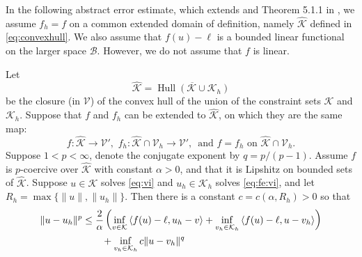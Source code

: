 \documentclass[hidelinks,onefignum,onetabnum,final]{siamart220329}  %
\newcommand{\cB}{\mathcal{B}}
\newcommand{\cK}{\mathcal{K}}
\newcommand{\cV}{\mathcal{V}}
\newcommand{\hcK}{\widehat{\cK}}
\newcommand{\ip}[2]{\left<#1,#2\right>}
\DeclareMathOperator*{\Hull}{Hull}
\begin{document}
In the following abstract error estimate, which extends \cite{Falk1974} and Theorem 5.1.1 in \cite{Ciarlet2002}, we assume $f_h=f$ on a common extended domain of definition, namely $\hcK$ defined in \eqref{eq:convexhull}.  We also assume that $f(u)-\ell$ is a bounded linear functional on the larger space $\cB$.  However, we do not assume that $f$ is linear.

\begin{theorem} \label{thm:abstractestimate}  Let
\begin{equation}
\hcK = \overline{\Hull{(\cK \cup \cK_h)}}  \label{eq:convexhull}
\end{equation}
be the closure (in $\cV$) of the convex hull of the union of the constraint sets $\cK$ and $\cK_h$.  Suppose that $f$ and $f_h$ can be extended to $\hcK$, on which they are the same map:
\begin{equation}
f:\hcK \to \cV', \,\, f_h:\hcK \cap \cV_h \to \cV', \, \text{ and } f=f_h \text{ on } \hcK \cap \cV_h.  \label{eq:commonextension}
\end{equation}
Suppose $1<p<\infty$, denote the conjugate exponent by $q=p/(p-1)$.  Assume $f$ is $p$-coercive over $\hcK$ with constant $\alpha>0$, and that it is Lipshitz on bounded sets of $\hcK$.  Suppose $u\in\cK$ solves \eqref{eq:vi} and $u_h\in\cK_h$ solves \eqref{eq:fe:vi}, and let $R_h=\max\{\|u\|,\|u_h\|\}$.  Then there is a constant $c=c(\alpha,R_h)>0$ so that
\begin{align}
\|u-u_h\|^p &\le \frac{2}{\alpha} \left(\inf_{v\in\cK} \ip{f(u)-\ell}{u_h-v} + \inf_{v_h\in\cK_h} \ip{f(u)-\ell}{u-v_h}\right) \label{eq:abstractestimate} \\
   &\qquad + \inf_{v_h\in\cK_h} c \|u - v_h\|^q \notag
\end{align}
\end{theorem}
\end{document}

